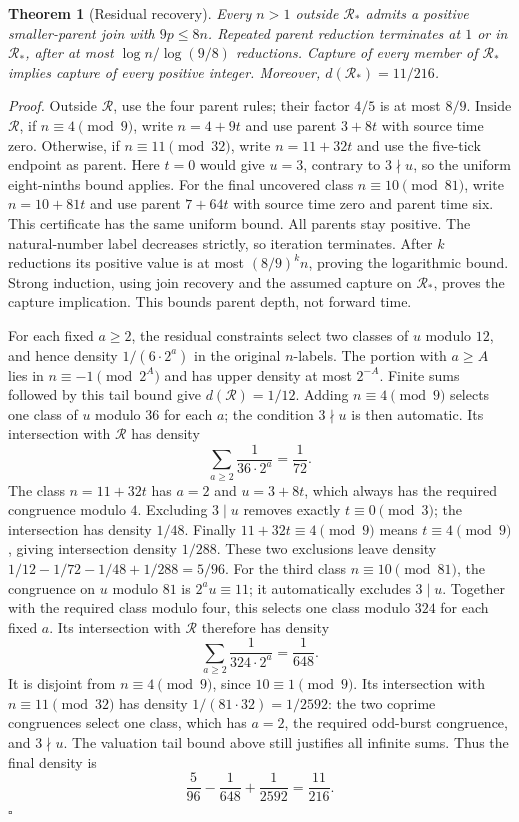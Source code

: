 \documentclass[11pt,letterpaper]{article}
\newtheorem{theorem}{Theorem}
\newenvironment{proof}{\noindent\textit{Proof.}}{\hfill\(\square\)}
\begin{document}
\begin{theorem}[Residual recovery]
Every \(n>1\) outside \(\mathcal R_*\) admits a positive smaller-parent
join with \(9p\le8n\). Repeated parent reduction terminates at \(1\) or
in \(\mathcal R_*\), after at most \(\log n/\log(9/8)\) reductions.
Capture of every member of \(\mathcal R_*\) implies capture of every
positive integer. Moreover, \(d(\mathcal R_*)=11/216\).
\end{theorem}
\begin{proof}
Outside \(\mathcal R\), use the four parent rules; their factor \(4/5\)
is at most \(8/9\). Inside \(\mathcal R\), if \(n\equiv4\pmod9\), write
\(n=4+9t\) and use parent \(3+8t\) with source time zero. Otherwise, if
\(n\equiv11\pmod{32}\), write \(n=11+32t\) and use the five-tick
endpoint as parent. Here \(t=0\) would give \(u=3\), contrary to
\(3\nmid u\), so the uniform eight-ninths bound applies.
For the final uncovered class \(n\equiv10\pmod{81}\), write
\(n=10+81t\) and use parent \(7+64t\) with source time zero and
parent time six. This certificate has the same uniform bound.
All parents stay positive. The natural-number label decreases strictly,
so iteration terminates. After \(k\) reductions its positive value is at
most \((8/9)^k n\), proving the logarithmic bound. Strong induction,
using join recovery and the assumed capture on \(\mathcal R_*\), proves
the capture implication. This bounds parent depth, not forward time.

For each fixed \(a\ge2\), the residual constraints select two classes
of \(u\) modulo \(12\), and hence density \(1/(6\cdot2^a)\) in the
original \(n\)-labels. The portion with \(a\ge A\) lies in
\(n\equiv-1\pmod{2^A}\) and has upper density at most \(2^{-A}\).
Finite sums followed by this tail bound give \(d(\mathcal R)=1/12\).
Adding \(n\equiv4\pmod9\) selects one class of \(u\) modulo \(36\)
for each \(a\); the condition \(3\nmid u\) is then automatic. Its
intersection with \(\mathcal R\) has density
\[
\sum_{a\ge2}\frac1{36\cdot2^a}=\frac1{72}.
\]
The class \(n=11+32t\) has \(a=2\) and \(u=3+8t\), which always has
the required congruence modulo \(4\). Excluding \(3\mid u\) removes
exactly \(t\equiv0\pmod3\); the intersection has density \(1/48\).
Finally \(11+32t\equiv4\pmod9\) means \(t\equiv4\pmod9\), giving
intersection density \(1/288\). These two exclusions leave density
\(1/12-1/72-1/48+1/288=5/96\).
For the third class \(n\equiv10\pmod{81}\), the congruence on
\(u\) modulo \(81\) is \(2^a u\equiv11\); it automatically
excludes \(3\mid u\). Together with the required class modulo four,
this selects one class modulo \(324\) for each fixed \(a\). Its
intersection with \(\mathcal R\) therefore has density
\[
\sum_{a\ge2}\frac1{324\cdot2^a}=\frac1{648}.
\]
It is disjoint from \(n\equiv4\pmod9\), since \(10\equiv1\pmod9\).
Its intersection with \(n\equiv11\pmod{32}\) has density
\(1/(81\cdot32)=1/2592\): the two coprime congruences select one
class, which has \(a=2\), the required odd-burst congruence, and
\(3\nmid u\). The valuation tail bound above still justifies all
infinite sums. Thus the final density is
\[
\frac5{96}-\frac1{648}+\frac1{2592}=\frac{11}{216}.
\]
\end{proof}
\end{document}
